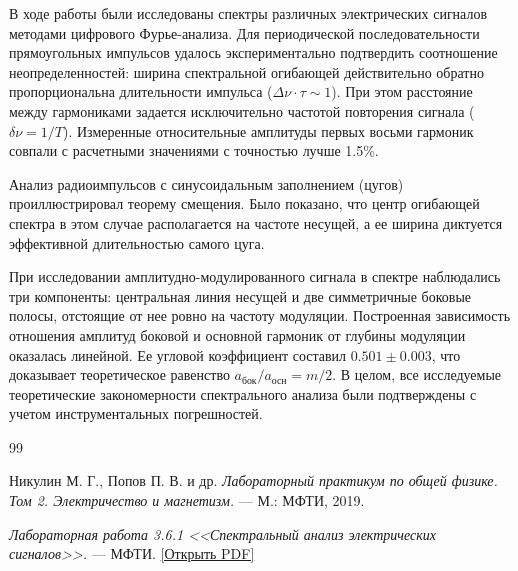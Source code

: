 \documentclass[reprint, amsmath, amssymb, aps, pra, nofootinbib]{revtex4-2}
\begin{document}
В ходе работы были исследованы спектры различных электрических сигналов методами цифрового Фурье-анализа. Для периодической последовательности прямоугольных импульсов удалось экспериментально подтвердить соотношение неопределенностей: ширина спектральной огибающей действительно обратно пропорциональна длительности импульса ($\Delta\nu \cdot \tau \sim 1$). При этом расстояние между гармониками задается исключительно частотой повторения сигнала ($\delta\nu = 1/T$). Измеренные относительные амплитуды первых восьми гармоник совпали с расчетными значениями с точностью лучше 1.5\%.

Анализ радиоимпульсов с синусоидальным заполнением (цугов) проиллюстрировал теорему смещения. Было показано, что центр огибающей спектра в этом случае располагается на частоте несущей, а ее ширина диктуется эффективной длительностью самого цуга. 

При исследовании амплитудно-модулированного сигнала в спектре наблюдались три компоненты: центральная линия несущей и две симметричные боковые полосы, отстоящие от нее ровно на частоту модуляции. Построенная зависимость отношения амплитуд боковой и основной гармоник от глубины модуляции оказалась линейной. Ее угловой коэффициент составил $0.501 \pm 0.003$, что доказывает теоретическое равенство $a_{\text{бок}}/a_{\text{осн}} = m/2$. В целом, все исследуемые теоретические закономерности спектрального анализа были подтверждены с учетом инструментальных погрешностей.


\begin{thebibliography}{99}

Никулин М. Г., Попов П. В. и др. \textit{Лабораторный практикум по общей физике. Том 2. Электричество и магнетизм.} — М.: МФТИ, 2019.

\textit{Лабораторная работа 3.6.1 <<Спектральный анализ электрических сигналов>>.} — МФТИ. \href{https://old.mipt.ru/education/chair/physics/S_III/lab_el/3.6.1-2023.pdf}{[Открыть PDF]}

\end{thebibliography}
\end{document}

